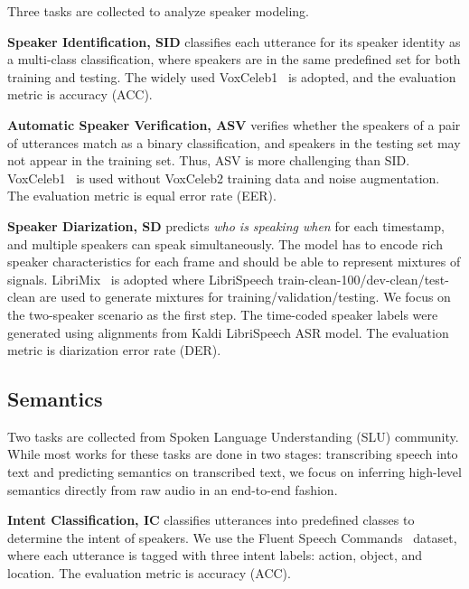 \documentclass[a4paper]{article}
\begin{document}
Three tasks are collected to analyze speaker modeling.

\textbf{Speaker Identification, SID} classifies each utterance for its speaker identity as a multi-class classification, where speakers are in the same predefined set for both training and testing.
The widely used VoxCeleb1~\cite{voxceleb1} is adopted, and the evaluation metric is accuracy (ACC).

\textbf{Automatic Speaker Verification, ASV} verifies whether the speakers of a pair of utterances match as a binary classification, and speakers in the testing set may not appear in the training set.
Thus, ASV is more challenging than SID.
VoxCeleb1~\cite{voxceleb1} is used without VoxCeleb2 training data and noise augmentation.
The evaluation metric is equal error rate (EER).

\textbf{Speaker Diarization, SD} predicts \textit{who is speaking when} for each timestamp, and multiple speakers can speak simultaneously.
The model has to encode rich speaker characteristics for each frame and should be able to represent mixtures of signals.
LibriMix~\cite{cosentino2020librimix} is adopted where LibriSpeech train-clean-100/dev-clean/test-clean are used to generate mixtures for training/validation/testing.
We focus on the two-speaker scenario as the first step.
The time-coded speaker labels were generated using alignments from Kaldi LibriSpeech ASR model.
The evaluation metric is diarization error rate (DER).

\subsection{Semantics}

Two tasks are collected from Spoken Language Understanding (SLU) community.
While most works for these tasks are done in two stages: transcribing speech into text and predicting semantics on transcribed text, we focus on inferring high-level semantics directly from raw audio in an end-to-end fashion.

\textbf{Intent Classification, IC} classifies utterances into predefined classes to determine the intent of speakers.
We use the Fluent Speech Commands~\cite{lugosch2019speech} dataset, where each utterance is tagged with three intent labels: action, object, and location.
The evaluation metric is accuracy (ACC).
\end{document}
